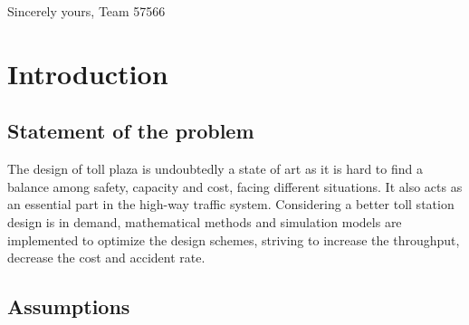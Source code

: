 \documentclass{mcmthesis}
\begin{document}
Sincerely yours,
Team 57566

\section{Introduction}

\subsection{Statement of the problem}

The design of toll plaza is undoubtedly a state of art as it is hard to find a balance among safety, capacity and cost, facing different situations. It also acts as an essential part in the high-way traffic system. Considering a better toll station design is in demand, mathematical methods and simulation models are implemented to optimize the design schemes, striving to increase the throughput, decrease the cost and accident rate.

\subsection{Assumptions}
\end{document}
